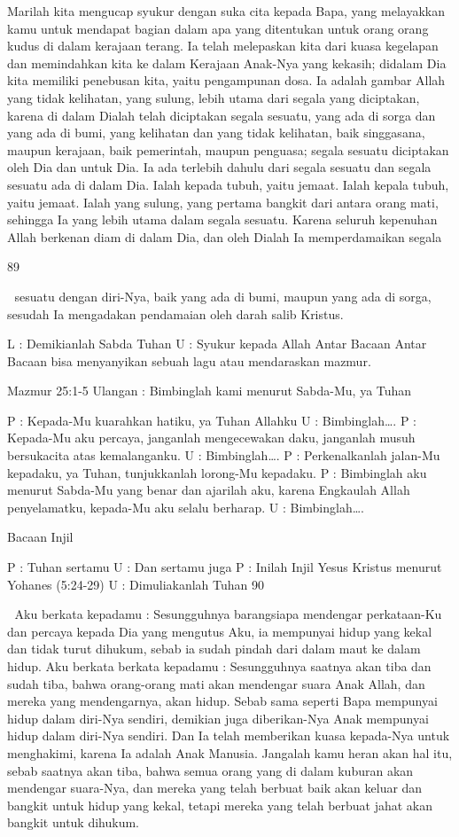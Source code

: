 \documentclass[10pt,a5paper,fancyhdr]{memoir}
\begin{document}
Marilah kita mengucap syukur dengan suka cita kepada 
Bapa, yang melayakkan kamu untuk mendapat bagian dalam 
apa yang ditentukan untuk orang orang kudus di dalam kerajaan 
terang. Ia telah melepaskan kita dari kuasa kegelapan dan 
memindahkan kita ke dalam Kerajaan Anak-Nya yang kekasih; 
didalam Dia kita memiliki penebusan kita, yaitu pengampunan 
dosa. Ia adalah gambar Allah yang tidak kelihatan, yang 
sulung, lebih utama dari segala yang diciptakan, karena di 
dalam Dialah telah diciptakan segala sesuatu, yang ada di sorga 
dan yang ada di bumi, yang kelihatan dan yang tidak kelihatan, 
baik singgasana, maupun kerajaan, baik pemerintah, maupun 
penguasa; segala sesuatu diciptakan oleh Dia dan untuk Dia. Ia 
ada terlebih dahulu dari segala sesuatu dan segala sesuatu ada 
di dalam Dia. Ialah kepada tubuh, yaitu jemaat. Ialah kepala 
tubuh, yaitu jemaat. Ialah yang sulung, yang pertama bangkit 
dari antara orang mati, sehingga Ia yang lebih utama dalam 
segala sesuatu. Karena seluruh kepenuhan Allah berkenan diam 
di dalam Dia, dan oleh Dialah Ia memperdamaikan segala 

89 



sesuatu dengan diri-Nya, baik yang ada di bumi, maupun yang 
ada di sorga, sesudah Ia mengadakan pendamaian oleh darah 
salib Kristus. 

L : Demikianlah Sabda Tuhan 
U : Syukur kepada Allah 
Antar Bacaan 
Antar Bacaan bisa menyanyikan sebuah lagu atau mendaraskan 
mazmur. 

Mazmur 25:1-5 
Ulangan : Bimbinglah kami menurut Sabda-Mu, ya Tuhan 

P : Kepada-Mu kuarahkan hatiku, ya Tuhan Allahku 
U : Bimbinglah…. 
P 
: Kepada-Mu aku percaya, janganlah mengecewakan daku, 
janganlah musuh bersukacita atas kemalanganku. 
U : Bimbinglah…. 
P : Perkenalkanlah jalan-Mu kepadaku, ya Tuhan, 
tunjukkanlah lorong-Mu kepadaku. 
P : Bimbinglah aku menurut Sabda-Mu yang benar dan 
ajarilah aku, karena Engkaulah Allah penyelamatku, 
kepada-Mu aku selalu berharap. 
U : Bimbinglah…. 

Bacaan Injil 

P : Tuhan sertamu 
U : Dan sertamu juga 
P : Inilah Injil Yesus Kristus menurut Yohanes (5:24-29) 
U : Dimuliakanlah Tuhan 
90 



Aku berkata kepadamu : Sesungguhnya barangsiapa 
mendengar perkataan-Ku dan percaya kepada Dia yang 
mengutus Aku, ia mempunyai hidup yang kekal dan tidak 
turut dihukum, sebab ia sudah pindah dari dalam maut ke 
dalam hidup. Aku berkata berkata kepadamu : 
Sesungguhnya saatnya akan tiba dan sudah tiba, bahwa 
orang-orang mati akan mendengar suara Anak Allah, dan 
mereka yang mendengarnya, akan hidup. Sebab sama 
seperti Bapa mempunyai hidup dalam diri-Nya sendiri, 
demikian juga diberikan-Nya Anak mempunyai hidup 
dalam diri-Nya sendiri. Dan Ia telah memberikan kuasa 
kepada-Nya untuk menghakimi, karena Ia adalah Anak 
Manusia. Jangalah kamu heran akan hal itu, sebab saatnya 
akan tiba, bahwa semua orang yang di dalam kuburan akan 
mendengar suara-Nya, dan mereka yang telah berbuat baik 
akan keluar dan bangkit untuk hidup yang kekal, tetapi 
mereka yang telah berbuat jahat akan bangkit untuk 
dihukum. 
\end{document}
